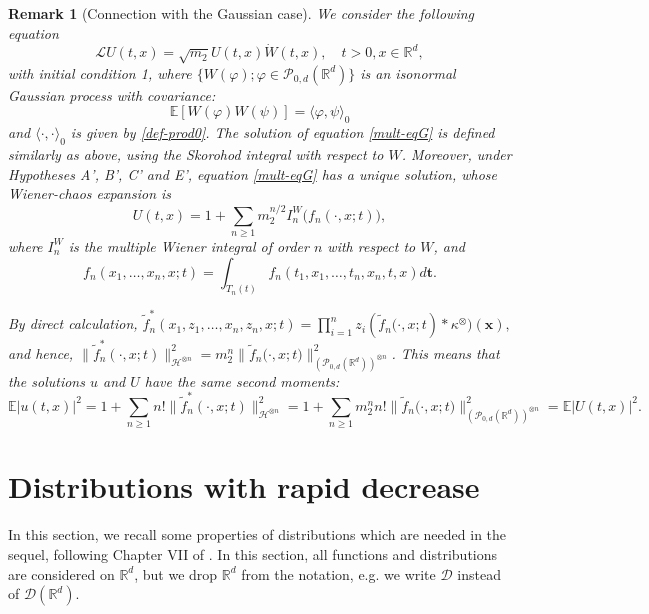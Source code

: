 \documentclass[12pt]{article}
\newtheorem{remark}[theorem]{Remark}
\def\cD{\mathcal{D}}
\def\cH{\mathcal{H}}
\def\cL{\mathcal{L}}
\def\cP{\mathcal{P}}
\def\bE{\mathbb{E}}
\def\bR{\mathbb{R}}
\def\k{\kappa}
\begin{document}
\begin{remark}[Connection with the Gaussian case]
{\rm
We consider the following equation
\begin{equation}
\label{mult-eqG}
\cL U(t,x)=\sqrt{m_2} U(t,x)\dot{W}(t,x), \quad t>0,x\in \bR^d,
\end{equation}
with initial condition 1, where $\{W(\varphi);\varphi \in \cP_{0,d}(\bR^d)\}$ is an isonormal Gaussian process with covariance:
\[
\bE[W(\varphi)W(\psi)]=\langle \varphi,\psi \rangle_{0}
\]
and $\langle \cdot,\cdot \rangle_{0}$ is given by \eqref{def-prod0}. The solution of equation \eqref{mult-eqG} is defined similarly as above, using the Skorohod integral with respect to $W$.
Moreover, under Hypotheses A', B', C' and E', equation \eqref{mult-eqG} has a unique solution, whose Wiener-chaos expansion is
\[
U(t,x)=1+\sum_{n\geq 1}m_2^{n/2}I_n^{W}\big(f_n(\cdot,x;t)\big),
\]
where $I_n^{W}$ is the multiple Wiener integral of order $n$ with respect to $W$, and
\[
f_n(x_1,\ldots,x_n,x;t)=\int_{T_{n}(t)}f_n(t_1,x_1,\ldots,t_n,x_n,t,x)d\pmb{t}.
\]

By direct calculation,
$\widetilde{f}_n^{*}(x_1,z_1,\ldots,x_n,z_n,x;t)=\prod_{i=1}^{n}z_i (\widetilde{f}_n\big(\cdot,x;t)*\k^{\otimes}\big)(\pmb{x}),
$
and hence, $\|\widetilde{f}_n^{*}(\cdot,x;t)\|_{\cH^{\otimes n}}^2=m_2^n \|\widetilde{f}_n\big(\cdot,x;t)\|_{(\cP_{0,d}(\bR^d))^{\otimes n}}^2$. This means that the solutions $u$ and $U$ have the same second moments:
\[
\bE|u(t,x)|^2=1+\sum_{n\geq 1}n!\|\widetilde{f}_n^{*}(\cdot,x;t)\|_{\cH^{\otimes n}}^2=
1+\sum_{n\geq 1}m_2^n n!\|\widetilde{f}_n\big(\cdot,x;t)\|_{(\cP_{0,d}(\bR^d))^{\otimes n}}^2=\bE|U(t,x)|^2.
\]
}
\end{remark}


\appendix



\section{Distributions with rapid decrease}
\label{app-distr}

In this section, we recall some properties of distributions which are needed in the sequel, following Chapter VII of \cite{schwartz66}.  In this section, all functions and distributions are considered on $\bR^d$, but we drop $\bR^d$ from the notation, e.g. we write $\cD$ instead of $\cD(\bR^d)$.

\medskip
\end{document}
